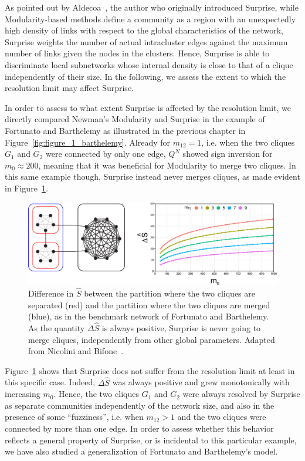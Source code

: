 As pointed out by Aldecoa~\cite{aldecoa2011}, the author who originally introduced Surprise, while Modularity-based methods define a community as a region with an unexpectedly high density of links with respect to the global characteristics of the network, Surprise weights the number of actual intracluster edges against the maximum number of links given the nodes in the clusters.
Hence, Surprise is able to discriminate local subnetworks whose internal density is close to that of a clique independently of their size.
In the following, we assess the extent to which the resolution limit may affect Surprise.

In order to assess to what extent Surprise is affected by the resolution limit, we directly compared Newman's Modularity and Surprise in the example of Fortunato and Barthelemy as illustrated in the previous chapter in Figure~\ref{fig:figure_1_barthelemy}. Already for $m_{12} = 1$, i.e. when the two cliques $G_1$ and $G_2$ were connected by only one edge, $Q^N$ showed sign inversion for $m_0 \approx 200$, meaning that it was beneficial for Modularity to merge two cliques.
In this same example though, Surprise instead never merges cliques, as made evident in Figure~\ref{fig:barthelemy_surprise}.

\begin{figure}[htb!]
\centering
\includegraphics[width=1.0\textwidth]{images/barthelemy_surprise.pdf}
\caption{Difference in $\hat{S}$ between the partition where the two cliques are separated (red) and the partition where the two cliques are merged (blue), as in the benchmark network of Fortunato and Barthelemy. As the quantity $\Delta \hat{S}$ is always positive, Surprise is never going to merge cliques, independently from other global parameters. Adapted from Nicolini and Bifone~\cite{nicolini2016}.}
\label{fig:barthelemy_surprise}
\end{figure}

Figure~\ref{fig:barthelemy_surprise} shows that Surprise does not suffer from the resolution limit at least in this specific case.
Indeed, $\Delta \hat{S}$ was always positive and grew monotonically with increasing $m_0$. 
Hence, the two cliques $G_1$ and $G_2$ were always resolved by Surprise as separate communities independently of the network size, and also in the presence of some ``fuzziness'', i.e. when $m_{12}>1$ and the two cliques were connected by more than one edge.
In order to assess whether this behavior reflects a general property of Surprise, or is incidental to this particular example, we have also studied a generalization of Fortunato and Barthelemy's model.

